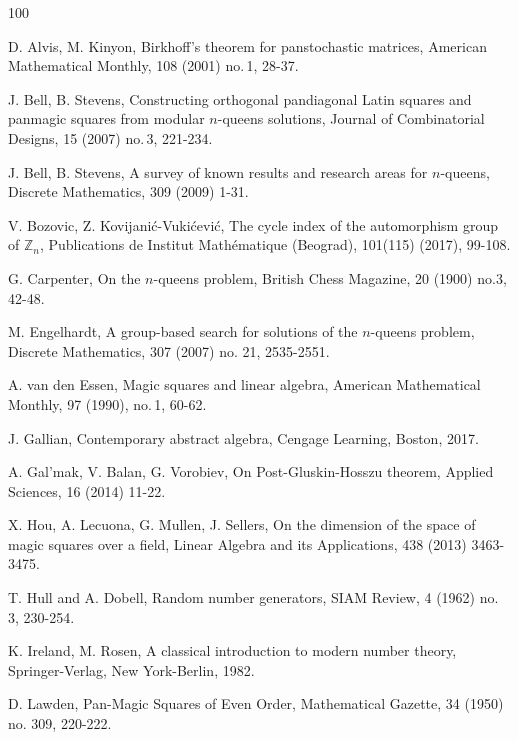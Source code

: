 \documentclass[11pt]{article}
\theoremstyle{plain}
\theoremstyle{definition}
\newcommand{\+}[1]{{#1}^\times}
\def\Z{{\mathbb Z}}
\begin{document}
{\footnotesize


\begin{thebibliography}{100}

 D. Alvis, M. Kinyon, Birkhoff’s theorem for panstochastic matrices, American Mathematical Monthly, 108 (2001) no.\,1, 28-37.

 J. Bell, B. Stevens, Constructing orthogonal pandiagonal Latin squares and panmagic squares from modular $n$-queens solutions, Journal of Combinatorial Designs, 15 (2007) no.\,3, 221-234.

 J. Bell, B. Stevens, A survey of known results and research areas for $n$-queens, Discrete Mathematics, 309 (2009) 1-31.

 V. Bozovic, Z. Kovijani\'c-Vuki\'cevi\'c, The cycle index of the automorphism group of $\Z_n$, Publications de Institut Mathématique (Beograd), 101(115) (2017), 99-108. 


 G. Carpenter, On the $n$-queens problem, British Chess Magazine, 20 (1900) no.3, 42-48.

 M. Engelhardt, A group-based search for solutions of the $n$-queens problem, Discrete Mathematics, 307 (2007) no. 21, 2535-2551.

 A. van den Essen, Magic squares and linear algebra, American Mathematical Monthly, 97 (1990), no.\,1, 60-62.

 J. Gallian, Contemporary abstract algebra, Cengage Learning, Boston, 2017.

 A. Gal'mak, V. Balan, G. Vorobiev, On Post-Gluskin-Hosszu theorem, Applied Sciences, 16 (2014)  11-22.

 X. Hou, A. Lecuona, G. Mullen, J. Sellers, On the dimension of the space of magic squares over a field, Linear Algebra and its Applications, 438 (2013) 3463-3475.

 T. Hull and A. Dobell, Random number generators, SIAM Review, 4 (1962) no. 3, 230-254.

 K. Ireland, M. Rosen, A classical introduction to modern number theory, Springer-Verlag, New York-Berlin, 1982.

 D. Lawden, Pan-Magic Squares of Even Order, Mathematical Gazette, 34 (1950) no. 309, 220-222.


\end{thebibliography}}
\end{document}
